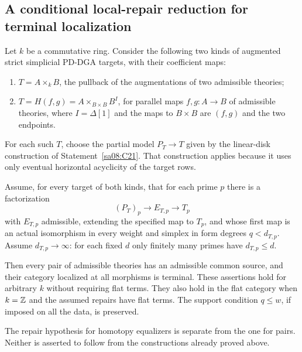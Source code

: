 \subsection{A conditional local-repair reduction for terminal localization}

\begin{theorem}
\label{sa08:C32}
Let $k$ be a commutative ring. Consider the following two kinds of
augmented strict simplicial PD-DGA targets, with their coefficient maps:
\begin{enumerate}
\item $T=A\times_k B$, the pullback of the augmentations of two
admissible theories;
\item $T=H(f,g)=A\times_{B\times B}B^I$, for parallel maps
$f,g:A\to B$ of admissible theories, where $I=\Delta[1]$ and
the maps to $B\times B$ are $(f,g)$ and the two endpoints.
\end{enumerate}
For each such $T$, choose the partial model $P_T\to T$ given by
the linear-disk construction of Statement~\ref{sa08:C21}.
That construction applies because it uses only eventual horizontal
acyclicity of the target rows.

Assume, for every target of both kinds, that for each prime $p$ there
is a factorization
\[
 (P_T)_p\longrightarrow E_{T,p}\longrightarrow T_p
\]
with $E_{T,p}$ admissible, extending the specified map to $T_p$,
and whose first map is an actual isomorphism in every weight and
simplex in form degrees $q<d_{T,p}$. Assume $d_{T,p}\to\infty$:
for each fixed $d$ only finitely many primes have $d_{T,p}\leq d$.

Then every pair of admissible theories has an admissible common
source, and their category localized at all morphisms is terminal.
These assertions hold for arbitrary $k$ without requiring flat terms.
They also hold in the flat category when $k=\mathbb Z$ and the assumed
repairs have flat terms. The support condition $q\leq w$, if imposed
on all the data, is preserved.

The repair hypothesis for homotopy equalizers is separate from the
one for pairs. Neither is asserted to follow from the constructions
already proved above.
\end{theorem}
